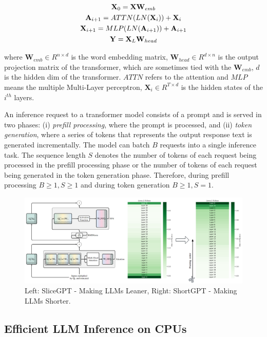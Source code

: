 \documentclass[conference]{IEEEtran}
\begin{document}
\begin{gather}
\mathbf{X}_0 = \mathbf{X}\mathbf{W}_{emb} \notag \\
\mathbf{A}_{i+1} = ATTN(LN(\mathbf{X}_i)) + \mathbf{X}_i \notag \\
\mathbf{X}_{i+1} = MLP(LN(\mathbf{A}_{i+1})) + \mathbf{A}_{i+1} \notag \\
\mathbf{Y} = \mathbf{X}_{L}\mathbf{W}_{head}
\label{eq:transformer}
\end{gather}

where $\mathbf{W}_{emb} \in R^{n\times d}$ is the word embedding matrix, $\mathbf{W}_{head} \in R^{d \times n}$ is the output projection matrix of the transformer, which are sometimes tied with the $\mathbf{W}_{emb}$, $d$ is the hidden dim of the transformer. $ATTN$ refers to the attention and $MLP$ means the multiple Multi-Layer perceptron, $\mathbf{X}_i \in R^{T \times d}$ is the hidden states of the $i^{th}$ layers.

An inference request to a transformer model consists of a prompt and is served in two phases: (i) \textit{prefill processing}, where the prompt is processed, and (ii) \textit{token generation}, where a series of tokens that represents the output response text is generated incrementally. The model can batch $B$ requests into a single inference task. The sequence length $S$ denotes the number of tokens of each request being processed in the prefill processing phase or the number of tokens of each request being generated in the token generation phase. Therefore, during prefill processing $B \geq 1, S \geq 1$ and during token generation $B \geq 1, S = 1$.

\begin{figure}[!t]
\centering
\includegraphics[width=\textwidth]{slice_short.png} 
\caption{Left: SliceGPT - Making LLMs Leaner, Right: ShortGPT - Making LLMs Shorter.}
\label{fig:slice_short}
\end{figure}

\subsection{Efficient LLM Inference on CPUs}
\end{document}
